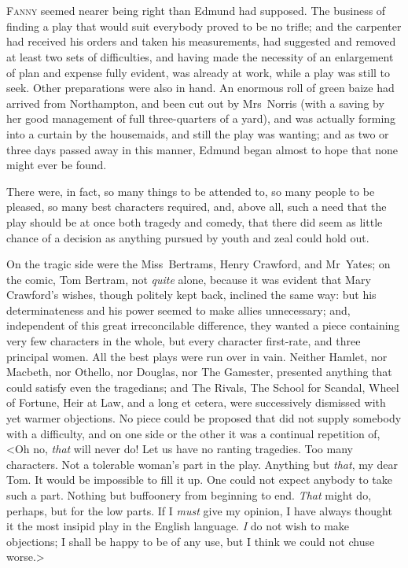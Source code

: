 \chapter[Chapter \thechapter]{} 

 \lettrine[lraise=0.3]{F}{anny} seemed nearer being right than Edmund had supposed. The business of finding a play that would suit everybody proved to be no trifle; and the carpenter had received his orders and taken his measurements, had suggested and removed at least two sets of difficulties, and having made the necessity of an enlargement of plan and expense fully evident, was already at work, while a play was still to seek. Other preparations were also in hand. An enormous roll of green baize had arrived from Northampton, and been cut out by Mrs~Norris (with a saving by her good management of full three-quarters of a yard), and was actually forming into a curtain by the housemaids, and still the play was wanting; and as two or three days passed away in this manner, Edmund began almost to hope that none might ever be found.

There were, in fact, so many things to be attended to, so many people to be pleased, so many best characters required, and, above all, such a need that the play should be at once both tragedy and comedy, that there did seem as little chance of a decision as anything pursued by youth and zeal could hold out.

On the tragic side were the Miss~Bertrams, Henry Crawford, and Mr~Yates; on the comic, Tom Bertram, not \textit{quite}  alone, because it was evident that Mary Crawford's wishes, though politely kept back, inclined the same way: but his determinateness and his power seemed to make allies unnecessary; and, independent of this great irreconcilable difference, they wanted a piece containing very few characters in the whole, but every character first-rate, and three principal women. All the best plays were run over in vain. Neither Hamlet, nor Macbeth, nor Othello, nor Douglas, nor The Gamester, presented anything that could satisfy even the tragedians; and The Rivals, The School for Scandal, Wheel of Fortune, Heir at Law, and a long et cetera, were successively dismissed with yet warmer objections. No piece could be proposed that did not supply somebody with a difficulty, and on one side or the other it was a continual repetition of, <Oh no, \textit{that}  will never do! Let us have no ranting tragedies. Too many characters. Not a tolerable woman's part in the play. Anything but \textit{that}, my dear Tom. It would be impossible to fill it up. One could not expect anybody to take such a part. Nothing but buffoonery from beginning to end. \textit{That}  might do, perhaps, but for the low parts. If I \textit{must}  give my opinion, I have always thought it the most insipid play in the English language. \textit{I}  do not wish to make objections; I shall be happy to be of any use, but I think we could not chuse worse.>

